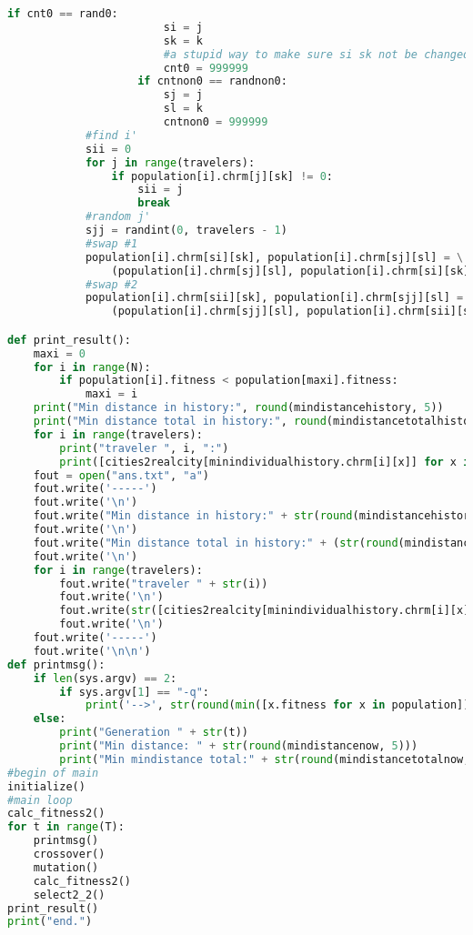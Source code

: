 \documentclass[UTF8,cs4size]{ctexart}
\begin{document}
\begin{lstlisting}[language=Python]
                    if cnt0 == rand0:
                        si = j
                        sk = k
                        #a stupid way to make sure si sk not be changed again
                        cnt0 = 999999
                    if cntnon0 == randnon0:
                        sj = j
                        sl = k
                        cntnon0 = 999999
            #find i'
            sii = 0
            for j in range(travelers):
                if population[i].chrm[j][sk] != 0:
                    sii = j
                    break
            #random j'
            sjj = randint(0, travelers - 1)
            #swap #1
            population[i].chrm[si][sk], population[i].chrm[sj][sl] = \
                (population[i].chrm[sj][sl], population[i].chrm[si][sk])
            #swap #2
            population[i].chrm[sii][sk], population[i].chrm[sjj][sl] = \
                (population[i].chrm[sjj][sl], population[i].chrm[sii][sk])

def print_result():
    maxi = 0
    for i in range(N):
        if population[i].fitness < population[maxi].fitness:
            maxi = i
    print("Min distance in history:", round(mindistancehistory, 5))
    print("Min distance total in history:", round(mindistancetotalhistory, 5))
    for i in range(travelers):
        print("traveler ", i, ":")
        print([cities2realcity[minindividualhistory.chrm[i][x]] for x in range(cities) if minindividualhistory.chrm[i][x]])
    fout = open("ans.txt", "a")
    fout.write('-----')
    fout.write('\n')
    fout.write("Min distance in history:" + str(round(mindistancehistory, 5)))
    fout.write('\n')
    fout.write("Min distance total in history:" + (str(round(mindistancetotalhistory, 5))))
    fout.write('\n')
    for i in range(travelers):
        fout.write("traveler " + str(i))
        fout.write('\n')
        fout.write(str([cities2realcity[minindividualhistory.chrm[i][x]] for x in range(cities) if minindividualhistory.chrm[i][x]]))
        fout.write('\n')
    fout.write('-----')
    fout.write('\n\n')
def printmsg():
    if len(sys.argv) == 2:
        if sys.argv[1] == "-q":
            print('-->', str(round(min([x.fitness for x in population]), 5)))
    else:
        print("Generation " + str(t))
        print("Min distance: " + str(round(mindistancenow, 5)))
        print("Min mindistance total:" + str(round(mindistancetotalnow, 5)))
#begin of main
initialize()
#main loop
calc_fitness2()
for t in range(T):
    printmsg()
    crossover()
    mutation()
    calc_fitness2()
    select2_2()
print_result()
print("end.")
\end{lstlisting}
\clearpage
\end{document}
